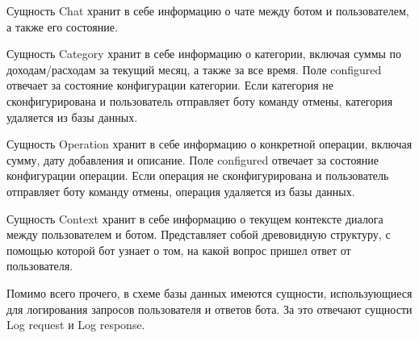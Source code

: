 Сущность Chat хранит в себе информацию о чате между ботом и пользователем, а также его состояние.

\newpage

Сущность Category хранит в себе информацию о категории, включая суммы по доходам/расходам за текущий месяц, а также за все время. Поле configured отвечает за состояние конфигурации категории. Если категория не сконфигурирована и пользователь отправляет боту команду отмены, категория удаляется из базы данных.

Сущность Operation хранит в себе информацию о конкретной операции, включая сумму, дату добавления и описание. Поле configured отвечает за состояние конфигурации операции. Если операция не сконфигурирована и пользователь отправляет боту команду отмены, операция удаляется из базы данных.

Сущность Context хранит в себе информацию о текущем контексте диалога между пользователем и ботом. Представляет собой древовидную структуру, с помощью которой бот узнает о том, на какой вопрос пришел ответ от пользователя.

Помимо всего прочего, в схеме базы данных имеются сущности, использующиеся для логирования запросов пользователя и ответов бота. За это отвечают сущности Log request и Log response.
